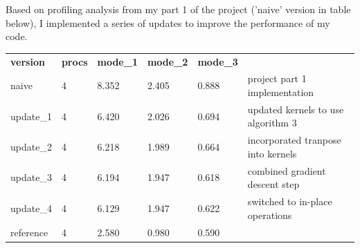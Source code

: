 \documentclass[12pt,letterpaper,twoside]{article}
\begin{document}
Based on profiling analysis from my part 1 of the project ('naive' version in table below), 
I implemented a series of updates to improve the performance of my code.
\begin{table}[h]
    \begin{tabular}{llllll}
    \textbf{version} & \textbf{procs} & \textbf{mode\_1} & \textbf{mode\_2} & \textbf{mode\_3} &                                      \\
    naive            & 4              & 8.352            & 2.405            & 0.888            & project part 1 implementation        \\
    update\_1        & 4              & 6.420            & 2.026            & 0.694            & updated kernels to use algorithm 3   \\
    update\_2        & 4              & 6.218            & 1.989            & 0.664            & incorporated tranpose into kernels   \\
    update\_3        & 4              & 6.194            & 1.947            & 0.618            & combined gradient descent step       \\
    update\_4        & 4              & 6.129            & 1.947            & 0.622            & switched to in-place operations      \\
    reference        & 4              & 2.580            & 0.980            & 0.590            &                                                             
    \end{tabular}
\end{table}
\end{document}
